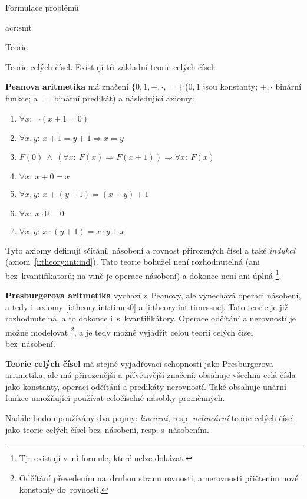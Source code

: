 \documentclass[thesis=M,czech]{FITthesis}[2012/06/26]
\newcommand{\acrlabel}[1]{acr:#1}
\newcommand{\acrf}[1]{\acrfull{\acrlabel{#1}}}
\newcommand{\hl}[1]{\textit{#1}}
\newcommand{\hll}[1]{\textbf{#1}}
\newcommand{\name}[1]{\hl{#1}}
\newcommand{\rf}[1]{\ref{#1}}
\begin{document}
\begin{section}{Formulace problémů}
\begin{subsection}{\acrf{smt}}
\begin{subsubsection}{Teorie}

\begin{paragraph}{Teorie celých čísel.}
\label{p:theory:formulation:smt:theory:int}
Existují tři základní teorie celých čísel:

\hll{Peanova aritmetika} má značení
$\{ {0, 1}, {+, \cdot}, = \}$
(${0,1}$ jsou konstanty;
${+,\cdot}$ binární funkce;
a $=$ binární predikát)
a následující axiomy:
\begin{enumerate}
\item $\forall x : \: \neg ( x + 1 = 0 )$
\item $\forall x,y : \: x+1 = y+1 \Rightarrow x = y$
\item \label{i:theory:int:ind}
   $F(0) \: \land \: \left( \forall x : \: F(x) \Rightarrow F(x+1) \right)
      \Rightarrow \forall x : \: F(x)$
\item $\forall x : \: x+0 = x$
\item $\forall x,y : \: x + (y+1) = (x+y) + 1$
\item \label{i:theory:int:times0}
   $\forall x : \: x \cdot 0 = 0$
\item \label{i:theory:int:timessuc}
   $\forall x,y : \: x \cdot (y+1) = x \cdot y + x$
\end{enumerate}
Tyto axiomy definují sčítání, násobení a rovnost
přirozených čísel a také \name{indukci}
(axiom~\rf{i:theory:int:ind}).
Tato teorie bohužel není rozhodnutelná
(ani bez~kvantifikatorů;
na vině je operace násobení)
a dokonce není ani úplná%
\footnote{Tj.~existují v~ní formule, které nelze dokázat.}.

\hll{Presburgerova aritmetika} vychází z~Peanovy,
ale vynechává operaci násobení,
a tedy i~axiomy \rf{i:theory:int:times0} a \rf{i:theory:int:timessuc}.
Tato teorie je již rozhodnutelná,
a to dokonce i~s~kvantifikátory.
Operace odčítání a nerovností je možné modelovat%
\footnote{Odčítání převedením na~druhou stranu rovnosti,
a nerovnosti přičtením nové konstanty do~rovnosti.},
a je tedy možné vyjádřit celou teorii celých čísel
bez~násobení.

\hll{Teorie celých čísel} má stejné vyjadřovací schopnosti
jako Presburgerova aritmetika,
ale má přirozenější a přívětivější značení:
obsahuje všechna celá čísla jako konstanty,
operaci odčítání a predikáty nerovností.
Také obsahuje unární funkce
umožňující používat celočíselné násobky proměnných.

Nadále budou používány dva pojmy:
\hl{lineární}, resp. \hl{nelineární}
teorie celých čísel
jako teorie celých čísel bez~násobení,
resp. s~násobením.
\end{paragraph} %


\end{subsubsection}
\end{subsection}
\end{section}
\end{document}
